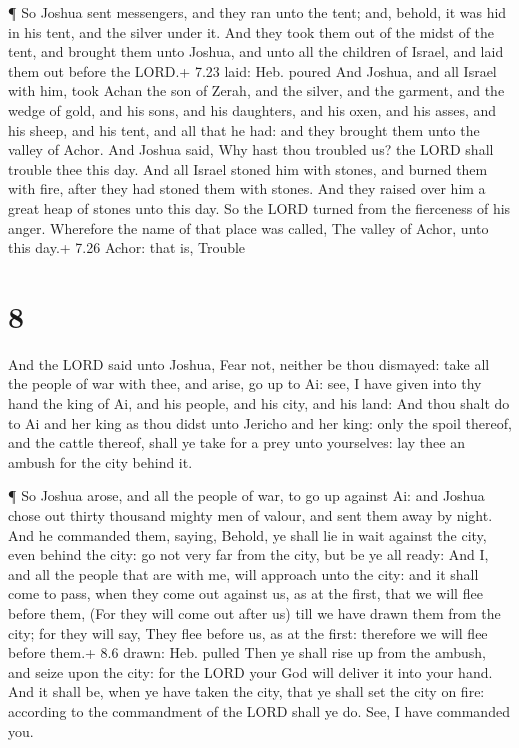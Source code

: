  ¶ So Joshua sent messengers, and they ran unto the tent;
and, behold, it was hid in his tent, and the silver under it.
 And they took them out of the midst of the tent, and
brought them unto Joshua, and unto all the children of Israel, and laid
them out before the LORD.+ 7.23 laid: Heb. poured  And
Joshua, and all Israel with him, took Achan the son of Zerah, and the
silver, and the garment, and the wedge of gold, and his sons, and his
daughters, and his oxen, and his asses, and his sheep, and his tent, and
all that he had: and they brought them unto the valley of Achor.
 And Joshua said, Why hast thou troubled us? the LORD shall
trouble thee this day. And all Israel stoned him with stones, and burned
them with fire, after they had stoned them with stones. 
And they raised over him a great heap of stones unto this day. So the
LORD turned from the fierceness of his anger. Wherefore the name of that
place was called, The valley of Achor, unto this day.+ 7.26 Achor: that
is, Trouble

\hypertarget{section-7}{%
\section{8}\label{section-7}}

 And the LORD said unto Joshua, Fear not, neither be thou
dismayed: take all the people of war with thee, and arise, go up to Ai:
see, I have given into thy hand the king of Ai, and his people, and his
city, and his land:  And thou shalt do to Ai and her king as
thou didst unto Jericho and her king: only the spoil thereof, and the
cattle thereof, shall ye take for a prey unto yourselves: lay thee an
ambush for the city behind it.

 ¶ So Joshua arose, and all the people of war, to go up
against Ai: and Joshua chose out thirty thousand mighty men of valour,
and sent them away by night.  And he commanded them, saying,
Behold, ye shall lie in wait against the city, even behind the city: go
not very far from the city, but be ye all ready:  And I, and
all the people that are with me, will approach unto the city: and it
shall come to pass, when they come out against us, as at the first, that
we will flee before them,  (For they will come out after us)
till we have drawn them from the city; for they will say, They flee
before us, as at the first: therefore we will flee before them.+ 8.6
drawn: Heb. pulled  Then ye shall rise up from the ambush,
and seize upon the city: for the LORD your God will deliver it into your
hand.  And it shall be, when ye have taken the city, that ye
shall set the city on fire: according to the commandment of the LORD
shall ye do. See, I have commanded you.

